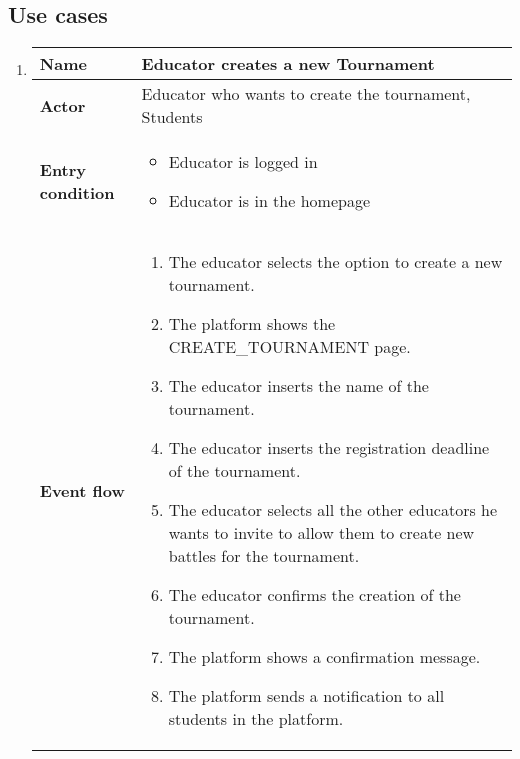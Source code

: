\subsection{Use cases}
\begin{enumerate}[label=\textbf{UC\arabic*}:,leftmargin=1.3cm]
      \item \textbf{}
      \begin{table}[H]
          \centering
          \begin{tabular}{|l|p{11.9cm}|}
              \hline
              \textbf{Name}            & Educator creates a new Tournament                     \\\hline
              \textbf{Actor}           & Educator who wants to create the tournament, Students                                                                             \\\hline
              \textbf{Entry condition} &
              \begin{itemize}
                  \item Educator is logged in
                  \item Educator is in the homepage
              \end{itemize}                                                \\\hline
              \textbf{Event flow}      &
              \begin{enumerate}[label=\arabic*.]
                  \item The educator selects the option to create a new tournament.
                  \item The platform shows the CREATE_TOURNAMENT page.
                  \item The educator inserts the name of the tournament.
                  \item The educator inserts the registration deadline of the tournament.
                  \item The educator selects all the other educators he wants to invite to allow them to create new battles for the tournament.
                  \item The educator confirms the creation of the tournament.
                  \item The platform shows a confirmation message.
                  \item The platform sends a notification to all students in the platform.

\end{enumerate}
\end{tabular}
\end{table}
\end{enumerate}
